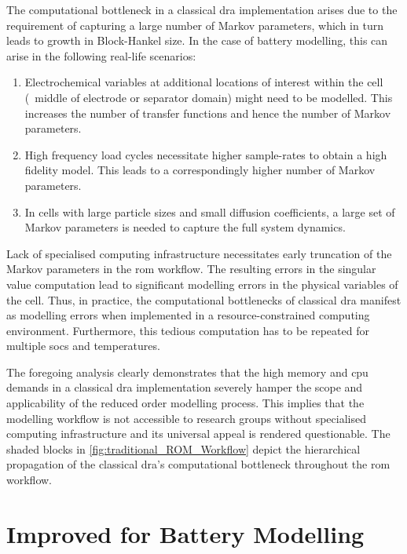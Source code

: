The computational bottleneck in a  classical \gls{dra} implementation arises due
to the  requirement of capturing a  large number of Markov  parameters, which in
turn leads  to growth in  Block-Hankel size. In  the case of  battery modelling,
this can arise in the following real-life scenarios:
\begin{enumerate}
	\item
        Electrochemical variables at additional locations of interest within the
        cell (\eg~middle of electrode or  separator domain) might need  to be
        modelled. This increases the number  of transfer functions and hence the
        number of Markov parameters.
	\item
        High frequency load  cycles necessitate higher sample-rates  to obtain a
        high fidelity  model. This leads  to a correspondingly higher  number of
        Markov parameters.
	\item
        In cells with  large particle sizes and small  diffusion coefficients, a
        large set  of Markov  parameters is  needed to  capture the  full system
        dynamics.
\end{enumerate}
Lack  of  specialised  computing infrastructure  necessitates  early  truncation
of  the  Markov parameters  in  the  \gls{rom}  workflow. The  resulting  errors
in  the singular  value  computation  lead to  significant  modelling errors  in
the  physical  variables of  the  cell.  Thus,  in practice,  the  computational
bottlenecks of classical \gls{dra} manifest as modelling errors when implemented
in  a  resource-constrained  computing environment.  Furthermore,  this  tedious
computation has to be repeated for multiple \glspl{soc} and temperatures.

The foregoing analysis  clearly demonstrates that the high  memory and \gls{cpu}
demands in  a classical \gls{dra}  implementation severely hamper the  scope and
applicability  of the  reduced order  modelling process.  This implies  that the
modelling  workflow is  not accessible  to research  groups without  specialised
computing infrastructure and its universal  appeal is rendered questionable. The
shaded  blocks in  \cref{fig:traditional_ROM_Workflow}  depict the  hierarchical
propagation of the classical \gls{dra}'s computational bottleneck throughout the
\gls{rom} workflow.

\section{Improved  for Battery Modelling}\label{sec:Efficient-Computation-of}

